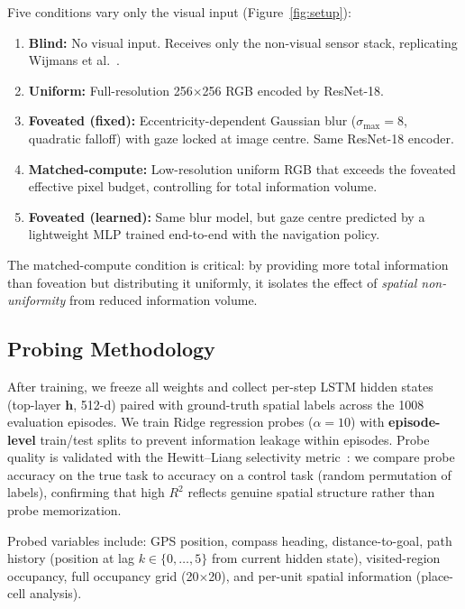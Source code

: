 \documentclass[10pt,conference,compsocconf]{IEEEtran}
\begin{document}
Five conditions vary only the visual input (Figure~\ref{fig:setup}):

\begin{enumerate}
    \item \textbf{Blind:} No visual input. Receives only the non-visual sensor stack, replicating Wijmans et al.~\cite{wijmans2023emergence}.
    \item \textbf{Uniform:} Full-resolution 256$\times$256 RGB encoded by ResNet-18.
    \item \textbf{Foveated (fixed):} Eccentricity-dependent Gaussian blur ($\sigma_{\max}=8$, quadratic falloff) with gaze locked at image centre. Same ResNet-18 encoder.
    \item \textbf{Matched-compute:} Low-resolution uniform RGB that exceeds the foveated effective pixel budget, controlling for total information volume.
    \item \textbf{Foveated (learned):} Same blur model, but gaze centre predicted by a lightweight MLP trained end-to-end with the navigation policy.
\end{enumerate}

The matched-compute condition is critical: by providing more total information than foveation but distributing it uniformly, it isolates the effect of \emph{spatial non-uniformity} from reduced information volume.

\subsection{Probing Methodology}

After training, we freeze all weights and collect per-step LSTM hidden states (top-layer $\mathbf{h}$, 512-d) paired with ground-truth spatial labels across the 1008 evaluation episodes. We train Ridge regression probes ($\alpha=10$) with \textbf{episode-level} train/test splits to prevent information leakage within episodes. Probe quality is validated with the Hewitt--Liang selectivity metric~\cite{hewitt2019control}: we compare probe accuracy on the true task to accuracy on a control task (random permutation of labels), confirming that high $R^2$ reflects genuine spatial structure rather than probe memorization.

Probed variables include: GPS position, compass heading, distance-to-goal, path history (position at lag $k \in \{0,\ldots,5\}$ from current hidden state), visited-region occupancy, full occupancy grid (20$\times$20), and per-unit spatial information (place-cell analysis).
\end{document}
